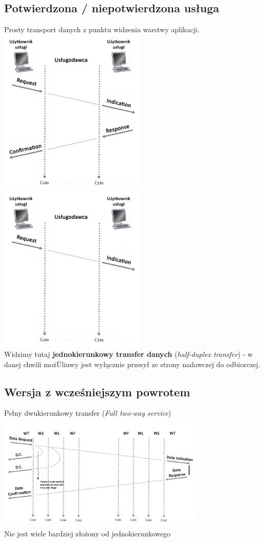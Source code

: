 \documentclass[a4paper,twoside]{article}
\begin{document}
\subsection{Potwierdzona / niepotwierdzona usługa}
Prosty transport danych z punktu widzenia warstwy aplikacji.\\
\includegraphics[width=7cm]{./images/image03_confirmation.jpg}
\includegraphics[width=7cm]{./images/image03_no_confirmation.jpg}\\
Widzimy tutaj \textbf{jednokierunkowy transfer danych} (\emph{half-duplex transfer}) - w danej chwili możÜliuwy jest wyłącznie przesył ze strony nadawczej do odbiorczej.
\subsection{Wersja z wcześniejszym powrotem}
Pełny dwukierunkowy transfer (\emph{Full two-way service})\\
\includegraphics[width=10cm]{./images/image04.jpg}\\
Nie jest wiele bardziej złożony od jednokierunkowego
\end{document}
